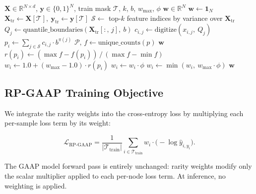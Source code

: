 \begin{algorithm}[htbp]
\caption{Rare-pattern weight computation. Weights are precomputed once on CPU before training; no gradients are required.}
\label{alg:rare_weights}
\begin{algorithmic}[1]
\Require $\mathbf{X} \in \mathbb{R}^{N \times d}$, $\mathbf{y} \in \{0,1\}^N$, train mask $\mathcal{T}$, $k$, $b$, $w_{\text{max}}$, $\phi$
\Ensure $\mathbf{w} \in \mathbb{R}^N$
\State $\mathbf{w} \gets \mathbf{1}_N$
\State $\mathbf{X}_{\text{tr}} \gets \mathbf{X}[\mathcal{T}],\ \mathbf{y}_{\text{tr}} \gets \mathbf{y}[\mathcal{T}]$
\State $\mathcal{S} \gets$ top-$k$ feature indices by variance over $\mathbf{X}_{\text{tr}}$
    \State $Q_j \gets \text{quantile\_boundaries}(\mathbf{X}_{\text{tr}}[:,\,j],\ b)$ 
    \State $c_{i,j} \gets \text{digitize}(x_{i,j},\ Q_j)$ 
\EndFor
\State $p_i \gets \sum_{j \in \mathcal{S}} c_{i,j} \cdot b^{\pi(j)}$ 
\State $\mathcal{P},\, f \gets \text{unique\_counts}(p)$
    \State \Return $\mathbf{w}$
\EndIf
\State $r(p_i) \gets (\max f - f(p_i))\, /\, (\max f - \min f)$ 
\State $w_i \gets 1.0 + (w_{\text{max}} - 1.0) \cdot r(p_i)$ 
    \State $w_i \gets w_i \cdot \phi$
\EndFor
\State $w_i \gets \min(w_i,\ w_{\text{max}} \cdot \phi)$ 
\State \Return $\mathbf{w}$
\end{algorithmic}
\end{algorithm}

\subsection{RP-GAAP Training Objective}

We integrate the rarity weights into the cross-entropy loss by multiplying each per-sample loss term by its weight:

\begin{equation}
\mathcal{L}_{\text{RP-GAAP}} = \frac{1}{|\mathcal{T}_{\text{train}}|} \sum_{i \in \mathcal{T}_{\text{train}}} w_i \cdot \big(-\log \hat{y}_{i, y_i}\big).
\label{eq:rpgaap_loss}
\end{equation}

The GAAP model forward pass is entirely unchanged: rarity weights modify only the scalar multiplier applied to each per-node loss term. At inference, no weighting is applied.

